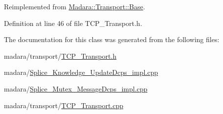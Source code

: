 Reimplemented from \hyperlink{classMadara_1_1Transport_1_1Base_a82c2a7ef9058b2c9a520d900c9a9f6e0}{Madara::Transport::Base}.



Definition at line 46 of file TCP\_\-Transport.h.



The documentation for this class was generated from the following files:\begin{DoxyCompactItemize}
\item 
madara/transport/\hyperlink{TCP__Transport_8h}{TCP\_\-Transport.h}\item 
madara/\hyperlink{Splice__Knowledge__UpdateDcps__impl_8cpp}{Splice\_\-Knowledge\_\-UpdateDcps\_\-impl.cpp}\item 
madara/\hyperlink{Splice__Mutex__MessageDcps__impl_8cpp}{Splice\_\-Mutex\_\-MessageDcps\_\-impl.cpp}\item 
madara/transport/\hyperlink{TCP__Transport_8cpp}{TCP\_\-Transport.cpp}\end{DoxyCompactItemize}
